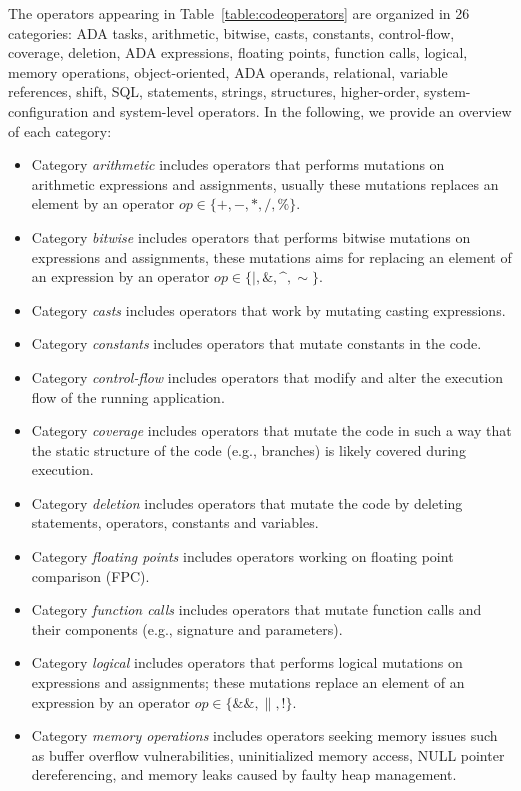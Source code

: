 The operators appearing in Table~\ref{table:codeoperators} are organized in 26 categories: ADA tasks, arithmetic, bitwise, casts, constants, control-flow, coverage, deletion, ADA expressions, floating points, function calls, logical, memory operations, object-oriented, ADA operands, relational, variable references, shift, SQL, statements, strings, structures, higher-order, system-configuration and system-level operators. In the following, we provide an overview of each category:
\begin{itemize}
\item Category \emph{arithmetic} includes operators that performs mutations on arithmetic expressions and assignments, usually these mutations replaces an element by an operator $op \in \{+, -, *, /, \%\}$. 
\item Category \emph{bitwise} includes operators that performs bitwise mutations on expressions and assignments, these mutations aims for replacing an element of an expression by an operator $op \in \{\mid, \&, \^{}, \sim\}$. 
\item Category \emph{casts} includes operators that work by mutating casting expressions.
\item Category \emph{constants} includes operators that mutate constants in the code. 
\item Category \emph{control-flow} includes operators that modify and alter the execution flow of the running application.
\item Category \emph{coverage} includes operators that mutate the code in such a way that the static structure of the code (e.g., branches) is likely covered during execution.
\item Category \emph{deletion} includes operators that mutate the code by deleting statements, operators, constants and variables.  
\item Category \emph{floating points} includes operators working on floating point comparison (FPC).
\item Category \emph{function calls} includes operators that mutate function calls and their components (e.g., signature and parameters).
\item Category \emph{logical} includes operators that performs logical mutations on expressions and assignments; these mutations replace an element of an expression by an operator $op \in \{\&\&, \|, !\}$.
\item Category \emph{memory operations} includes operators seeking memory issues such as buffer overflow vulnerabilities, uninitialized memory access, NULL pointer dereferencing, and memory leaks caused by faulty heap management.

\end{itemize}
